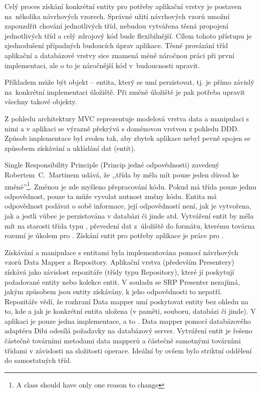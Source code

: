 Celý proces získání konkrétní entity pro potřeby aplikační vrstvy je postaven na~několika návrhových vzorech. Správné užití návrhových vzorů umožní zapouzdřit chování jednotlivých tříd, nebudou vytvářena těsná propojení jednotlivých tříd a celý zdrojový kód bude flexibilnější. Cílem tohoto přístupu je zjednodušení případných budoucích úprav aplikace. Těsné provázání tříd aplikační a databázové vrstvy sice znamená méně náročnou práci při první implementaci, ale o to je náročnější kód v~budoucnosti upravit. 

Příkladem může být objekt -- entita, který se umí perzistovat, tj. je přímo závislý na~konkrétní implementaci úložiště. Při změně úložiště je pak potřeba upravit všechny takové objekty.

Z pohledu architektury MVC reprezentuje modelová vrstva data a manipulaci s nimi a v aplikaci se výrazně překrývá s doménovou vrstvou z pohledu DDD. Způsob implementace byl zvolen tak, aby zbytek aplikace nebyl pevně spojen se způsobem získávání a ukládání dat (entit).

Single Responsibility Principle (Princip jedné odpovědnosti) zavedený Robertem~C.~Martinem udává, že ,,třída by měla mít pouze jeden důvod ke změně''\footnote{A class should have only one reason to change\cite{Martin2002}}. Změnou je zde myšleno přepracování kódu. Pokud má třída pouze jednu odpovědnost, pouze ta může vyvolat nutnost změny kódu. Entita má odpovědnost podávat o sobě informace, její odpovědností není, jak je vytvořena, jak a jestli vůbec je perzistována v databázi či jinde atd. Vytváření entit by měla mít na starosti třída typu , převedení dat z~úložiště do formátu, kterému továrna rozumí je úkolem pro . Získání entit pro potřeby aplikace je práce pro . 

Získávání a manipulace s entitami byla implementována pomocí návrhových vzorů Data Mapper a Repository. Aplikační vrstva (především Presentery) získává jako závislost repozitáře (třídy typu Repository), které jí poskytují požadované entity nebo kolekce entit. V souladu se SRP Presenter nezajímá, jakým způsobem jsou entity získávány, k jeho odpovědnosti to nepatří. Repozitáře vědí, že rozhraní Data mapper umí poskytovat entity bez ohledu na to, kde a jak je konkrétní entita uložena (v paměti, souboru, databázi či jinde). V aplikaci je pouze jedna implementace, a to . Data mapper pomocí databázového adaptéru Dibi odesílá požadavky na databázový server. Vytváření entit je řešeno částečně továrními metodami data mapperů a částečně samotnými továrními třídami v závislosti na složitosti operace. Ideální by ovšem bylo striktní oddělení do samostatných tříd.

